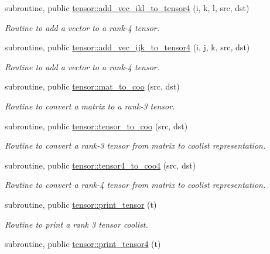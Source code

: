 \begin{DoxyCompactItemize}
subroutine, public \hyperlink{namespacetensor_a4dd51ee85d6dffa3350880defc9823e8}{tensor\+::add\+\_\+vec\+\_\+ikl\+\_\+to\+\_\+tensor4} (i, k, l, src, dst)
\begin{DoxyCompactList}\small\item\em Routine to add a vector to a rank-\/4 tensor. \end{DoxyCompactList}\item 
subroutine, public \hyperlink{namespacetensor_adfadc0660ec0e87b9d0dd3c383919d6b}{tensor\+::add\+\_\+vec\+\_\+ijk\+\_\+to\+\_\+tensor4} (i, j, k, src, dst)
\begin{DoxyCompactList}\small\item\em Routine to add a vector to a rank-\/4 tensor. \end{DoxyCompactList}\item 
subroutine, public \hyperlink{namespacetensor_a75d1a9ca8b39e9ad4b151a7b4b45c70f}{tensor\+::mat\+\_\+to\+\_\+coo} (src, dst)
\begin{DoxyCompactList}\small\item\em Routine to convert a matrix to a rank-\/3 tensor. \end{DoxyCompactList}\item 
subroutine, public \hyperlink{namespacetensor_a39f5944ef78c2d2aaac59477d8c6848f}{tensor\+::tensor\+\_\+to\+\_\+coo} (src, dst)
\begin{DoxyCompactList}\small\item\em Routine to convert a rank-\/3 tensor from matrix to coolist representation. \end{DoxyCompactList}\item 
subroutine, public \hyperlink{namespacetensor_ae8308730212d86ee401775f02f631310}{tensor\+::tensor4\+\_\+to\+\_\+coo4} (src, dst)
\begin{DoxyCompactList}\small\item\em Routine to convert a rank-\/4 tensor from matrix to coolist representation. \end{DoxyCompactList}\item 
subroutine, public \hyperlink{namespacetensor_a5747516cd8a6fc9079fbb82d1b18dd98}{tensor\+::print\+\_\+tensor} (t)
\begin{DoxyCompactList}\small\item\em Routine to print a rank 3 tensor coolist. \end{DoxyCompactList}\item 
subroutine, public \hyperlink{namespacetensor_acb57d076f51b89419e4e8254ce13dd62}{tensor\+::print\+\_\+tensor4} (t)

\end{DoxyCompactItemize}
